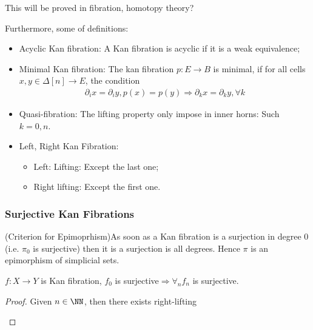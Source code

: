 \documentclass[Total.tex]{subfiles}
\begin{document}
				This will be proved in fibration, homotopy theory?
				
				Furthermore, some of definitions:
				\begin{Def}
					\begin{itemize}
						\item Acyclic Kan fibration: A Kan fibration is acyclic if it is a weak equivalence;
						\item Minimal Kan fibration: The kan fibration $p:E\rightarrow B$ is minimal, if for all cells $x,y\in \Delta[n]\rightarrow E$, the condition
						\begin{gather*}
							\partial_i x=\partial_i y,p(x)=p(y)\Rightarrow \partial_k x=\partial_k y,\forall k
						\end{gather*}
						\item Quasi-fibration: The lifting property only impose in inner horns: Such $k=0,n$.
						\item Left, Right Kan Fibration:
						\begin{itemize}
							\item Left: Lifting: Except the last one;
							\item Right lifting: Except the first one.
						\end{itemize}
					\end{itemize}
				\end{Def}
				
				\subsubsection{Surjective Kan Fibrations}
				
				\begin{lemma}
					(Criterion for Epimoprhism)As soon as a Kan fibration is a surjection in degree $0$(i.e. $\pi_0$ is surjective) then it is a surjection is all degrees. Hence $\pi$ is an epimorphism of simplicial sets.
					\begin{center}
						$f:X\rightarrow Y$ is Kan fibration, $f_0$ is surjective$\Rightarrow \forall_n f_n$ is surjective. 
					\end{center}
				\end{lemma}
				\begin{proof}
					Given $n\in \NN$, then there exists right-lifting
					\begin{center}
					\end{center}
				\end{proof}
				 
\end{document}
